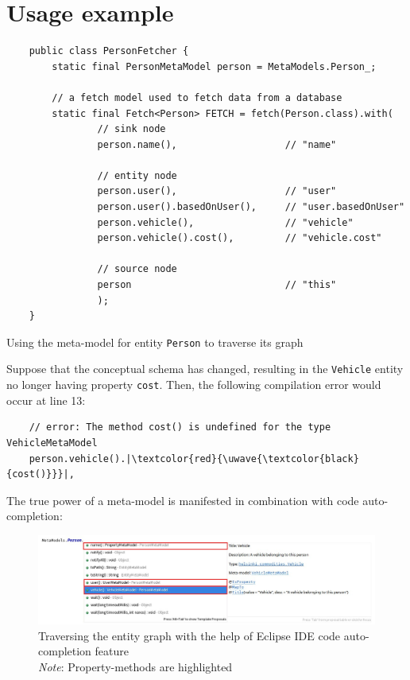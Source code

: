 \section{Usage example}
\begin{listing}[H]
    \begin{verbatim}
    public class PersonFetcher {
        static final PersonMetaModel person = MetaModels.Person_;
            
        // a fetch model used to fetch data from a database
        static final Fetch<Person> FETCH = fetch(Person.class).with(
                // sink node
                person.name(),                   // "name"

                // entity node
                person.user(),                   // "user"
                person.user().basedOnUser(),     // "user.basedOnUser"
                person.vehicle(),                // "vehicle"
                person.vehicle().cost(),         // "vehicle.cost"

                // source node
                person                           // "this"
                );
    }
    \end{verbatim}
    \caption{Using the meta-model for entity \texttt{Person} to traverse its graph}
    \label{lst:person_meta-model_usage}
\end{listing}

Suppose that the conceptual schema has changed, resulting in the \texttt{Vehicle} entity no longer having property \texttt{cost}. Then, the following compilation error would occur at line 13:
\begin{verbatim}
    // error: The method cost() is undefined for the type VehicleMetaModel
    person.vehicle().|\textcolor{red}{\uwave{\textcolor{black}{cost()}}}|,
\end{verbatim}

\n

The true power of a meta-model is manifested in combination with code auto-completion:

\begin{figure}[H]\centering
    \includegraphics[scale=0.5]{images/eclipse-hl.jpg}
    \caption[Traversing the entity graph with the help of Eclipse IDE code auto-completion feature]{Traversing the entity graph with the help of Eclipse IDE code auto-completion feature
    \\
    \textit{Note}: Property-methods are highlighted}\label{fig:eclipse}
\end{figure}



